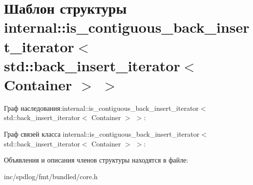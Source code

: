 \hypertarget{structinternal_1_1is__contiguous__back__insert__iterator_3_01std_1_1back__insert__iterator_3_01Container_01_4_01_4}{}\section{Шаблон структуры internal\+:\+:is\+\_\+contiguous\+\_\+back\+\_\+insert\+\_\+iterator$<$ std\+:\+:back\+\_\+insert\+\_\+iterator$<$ Container $>$ $>$}
\label{structinternal_1_1is__contiguous__back__insert__iterator_3_01std_1_1back__insert__iterator_3_01Container_01_4_01_4}


Граф наследования\+:internal\+:\+:is\+\_\+contiguous\+\_\+back\+\_\+insert\+\_\+iterator$<$ std\+:\+:back\+\_\+insert\+\_\+iterator$<$ Container $>$ $>$\+:


Граф связей класса internal\+:\+:is\+\_\+contiguous\+\_\+back\+\_\+insert\+\_\+iterator$<$ std\+:\+:back\+\_\+insert\+\_\+iterator$<$ Container $>$ $>$\+:


Объявления и описания членов структуры находятся в файле\+:\begin{DoxyCompactItemize}
\item 
inc/spdlog/fmt/bundled/core.\+h\end{DoxyCompactItemize}
